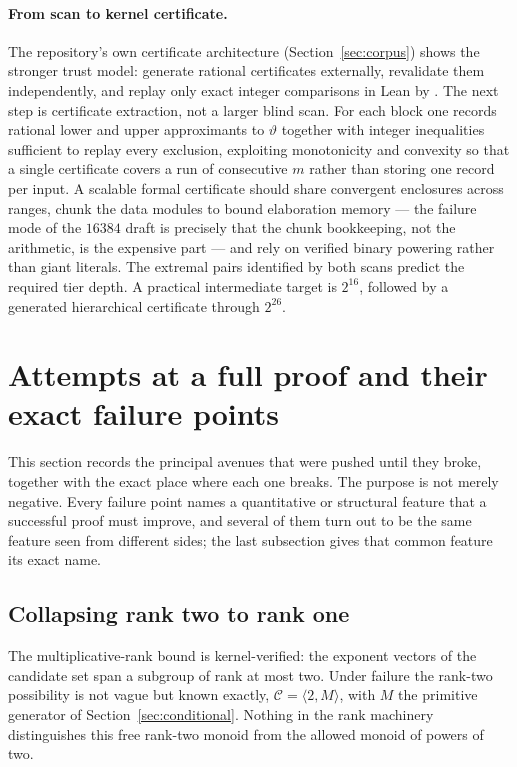 \documentclass[11pt,oneside]{article}
\theoremstyle{definition}
\theoremstyle{remark}
\newcommand{\thetaq}{\vartheta}
\newcommand{\Cand}{\mathcal C}
\newcommand{\lean}[1]{\texttt{\detokenize{#1}}}
\begin{document}
\paragraph{From scan to kernel certificate.}
The repository's own certificate architecture (Section~\ref{sec:corpus}) shows the stronger
trust model: generate rational certificates externally, revalidate them independently, and
replay only exact integer comparisons in Lean by \lean{decide}.  The next step is certificate
extraction, not a larger blind scan.  For each block one records rational lower and upper
approximants to $\thetaq$ together with integer inequalities sufficient to replay every
exclusion, exploiting monotonicity and convexity so that a single certificate covers a run of
consecutive $m$ rather than storing one record per input.  A scalable formal certificate
should share convergent enclosures across ranges, chunk the data modules to bound elaboration
memory --- the failure mode of the $16384$ draft is precisely that the chunk bookkeeping, not
the arithmetic, is the expensive part --- and rely on verified binary powering rather than
giant literals.  The extremal pairs identified by both scans predict the required tier depth.
A practical intermediate target is $2^{16}$, followed by a generated hierarchical certificate
through $2^{26}$.
\section{Attempts at a full proof and their exact failure points}
\label{sec:attempts}

This section records the principal avenues that were pushed until they broke, together with
the exact place where each one breaks.  The purpose is not merely negative.  Every failure
point names a quantitative or structural feature that a successful proof must improve, and
several of them turn out to be the same feature seen from different sides; the last
subsection gives that common feature its exact name.

\subsection{Collapsing rank two to rank one}
\label{at:rank}

The multiplicative-rank bound is kernel-verified: the exponent vectors of the candidate set
span a subgroup of rank at most two.  Under failure the rank-two possibility is not vague
but known exactly, $\Cand=\langle2,M\rangle$, with $M$ the primitive generator of
Section~\ref{sec:conditional}.  Nothing in the rank machinery distinguishes this free
rank-two monoid from the allowed monoid of powers of two.
\end{document}
